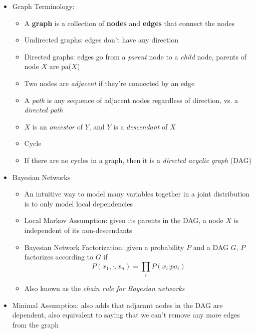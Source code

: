 \documentclass[../main.tex]{subfiles}
\begin{document}
\begin{itemize}
      \item Graph Terminology:
        \begin{itemize}
          \item A \textbf{graph} is a collection of \textbf{nodes} and \textbf{edges} that connect the nodes
          \item Undirected graphs: edges don't have any direction
          \item Directed graphs: edges go from a \textit{parent} node to a \textit{child} node, parents of node $X$ are pa($X$)
          \item Two nodes are \textit{adjacent} if they're connected by an edge
          \item A \textit{path} is any sequence of adjacent nodes regardless of direction, vs. a \textit{directed path}
          \item $X$ is an \textit{ancestor} of $Y$, and $Y$ is a \textit{descendant} of $X$
          \item Cycle
          \item If there are no cycles in a graph, then it is a \textit{directed acyclic graph} (DAG)
        \end{itemize}
      \item Bayesian Networks
        \begin{itemize}
          \item An intuitive way to model many variables together in a joint distribution is to only model local dependencies
          \item Local Markov Assumption: given its parents in the DAG, a node $X$ is independent of its non-descendants
          \item Bayesian Network Factorization: given a probability $P$ and a DAG $G$, $P$ factorizes according to $G$ if
          \begin{equation*}
            P(x_{1}, \cdot, x_{n}) = \prod_{i} P(x_{i}|pa_{i})
          \end{equation*}
          \item Also known as the \textit{chain rule for Bayesian networks}
        \end{itemize}
      \item Minimal Assumption: also adds that adjacant nodes in the DAG are dependent, also equivalent to saying that we can't remove any more edges from the graph
    \end{itemize}
\end{document}
